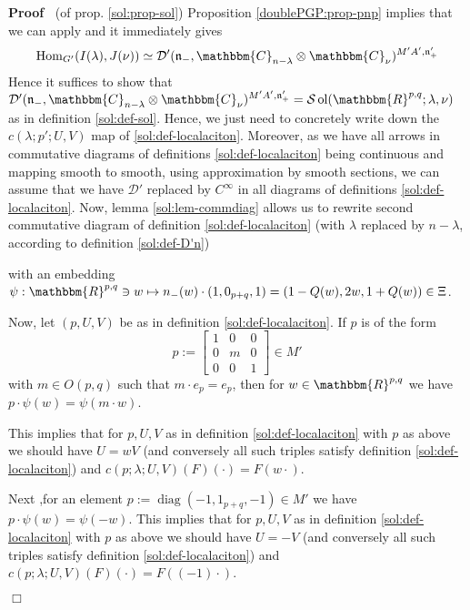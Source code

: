 \documentclass[12pt]{article}
\newcommand{\assign}{:=}
\newcommand{\tmop}[1]{\ensuremath{\operatorname{#1}}}
\renewenvironment{proof}{\noindent\textbf{Proof\ }}{\hspace*{\fill}$\Box$\medskip}
\theoremstyle{remark}
\begin{document}
\begin{proof}
  (of prop. \ref{sol:prop-sol}) Proposition \ref{doublePGP:prop-pnp} implies
  that we can apply {\cite[thm. 3.16]{kobayashi2015symmetry}} and it
  immediately gives
  \[ \tmop{Hom}_{G'} (I (\lambda), J (\nu)) \simeq \mathcal{D}'
     (\mathfrak{n}_-, \mathbbm{C}_{n - \lambda} \otimes \mathbbm{C}_{\nu})^{M'
     A', \mathfrak{n}'_+} \]
  Hence it suffices to show that $\mathcal{D}' (\mathfrak{n}_-, \mathbbm{C}_{n
  - \lambda} \otimes \mathbbm{C}_{\nu})^{M' A', \mathfrak{n}'_+} =\mathcal{S}
  \tmop{ol} (\mathbbm{R}^{p, q} ; \lambda, \nu)$ as in definition
  \ref{sol:def-sol}. Hence, we just need to concretely write down the $c
  (\lambda ; p' ; U, V)$ map of \ref{sol:def-localaciton}. Moreover, as we
  have all arrows in commutative diagrams of definitions
  \ref{sol:def-localaciton} being continuous and mapping smooth to smooth,
  using approximation by smooth sections, we can assume that we have
  $\mathcal{D}'$ replaced by $C^{\infty}$ in all diagrams of definitions
  \ref{sol:def-localaciton}. Now, lemma \ref{sol:lem-commdiag} allows us to
  rewrite second commutative diagram of definition \ref{sol:def-localaciton}
  (with $\lambda$ replaced by $n - \lambda$, according to definition
  \ref{sol:def-D'n})
  
  
  with an embedding $\psi : \mathbbm{R}^{p, q} \ni w \mapsto n_- (w) \cdot (1,
  0_{p + q}, 1) = (1 - Q (w), 2 w, 1 + Q (w)) \in \Xi$.
  
  Now, let $(p, U, V)$ be as in definition \ref{sol:def-localaciton}. If $p$
  is of the form
  \[ p \assign \left[ \begin{array}{ccc}
       1 & 0 & 0\\
       0 & m & 0\\
       0 & 0 & 1
     \end{array} \right] \in M' \]
  with $m \in O (p, q)$ such that $m \cdot e_p = e_p$, then for $w \in
  \mathbbm{R}^{p, q}$ we have $p \cdot \psi (w) = \psi (m \cdot w)$.
  
  This implies that for $p, U, V$ as in definition \ref{sol:def-localaciton}
  with $p$ as above we should have $U = w V$ (and conversely all such triples
  satisfy definition \ref{sol:def-localaciton}) and $c (p ; \lambda ; U, V)
  (F) (\cdot) = F (w \cdot)$.
  
  Next ,for an element $p \assign \tmop{diag} (- 1, 1_{p + q}, - 1) \in M'$ we
  have $p \cdot \psi (w) = \psi (- w)$. This implies that for $p, U, V$ as in
  definition \ref{sol:def-localaciton} with $p$ as above we should have $U = -
  V$ (and conversely all such triples satisfy definition
  \ref{sol:def-localaciton}) and $c (p ; \lambda ; U, V) (F) (\cdot) = F ((-
  1) \cdot)$.
  

\end{proof}
\end{document}
